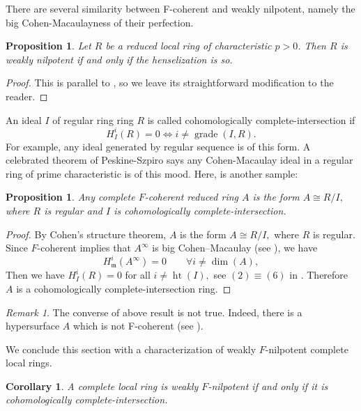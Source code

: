 \documentclass[11pt,a4paper]{amsart}
\numberwithin{equation}{section}
\newtheorem{proposition}[theorem]{Proposition}
\newtheorem{corollary}[theorem]{Corollary}
\theoremstyle{definition}
\theoremstyle{remark}
\newtheorem{remark}[theorem]{Remark}
\newcommand{\grade}{\operatorname{grade}}
\newcommand{\fm}{\mathfrak{m}}
\begin{document}
There are several similarity between F-coherent and weakly nilpotent, namely the big Cohen-Macaulayness of their perfection.
\begin{proposition}
	Let $R$ be a reduced local ring of characteristic $p > 0$. Then $R$ is
	weakly nilpotent if and only if the henselization 
	is so.
\end{proposition}

\begin{proof}
This is parallel to \cite[Proposition 3.18]{Shi10}, so we leave its straightforward modification to the reader.
\end{proof}

An ideal $I$ of regular ring ring $R$ is called  cohomologically complete-intersection if
$$H^i_I(R)=0\Longleftrightarrow i\neq \grade(I,R).$$For example, any ideal generated by regular sequence is of this form. A celebrated theorem of Peskine-Szpiro \cite{PS} says any Cohen-Macaulay ideal in a regular ring of prime characteristic is of this mood. Here, is another sample:
\begin{proposition}\label{4.5} Any complete $F$-coherent reduced ring $A$ is the form
	\(
	A \cong   R/I,
	\)
	where $R$ is regular and $I$ is cohomologically complete-intersection.
\end{proposition}
\begin{proof} By Cohen's structure theorem, $A$ is the form
	\(
	A \cong   R/I,
	\)
	where $R$ is regular. Since $F$-coherent implies that $A^\infty$ is big Cohen--Macaulay (see \cite{Shi10}), we have
	\[
	H_\fm^i(A^\infty)=0 \qquad  \forall i\neq  \dim(A) ,
	\]Then we have
	\(
	H_I^i(R)=0\) for all  \(i\neq \operatorname{ht}(I),
	\) see  $(2)\equiv(6)$ in \cite[Example 4.38]{topo}.
	Therefore $A$ is a cohomologically complete-intersection ring.
\end{proof}


\begin{remark}\label{46}
	The converse of above result is not true. Indeed, there is a hypersurface $A$ which is not F-coherent (see \cite[Example 4.4]{Shi10}).
\end{remark}





We conclude this section with a characterization of weakly \(F\)-nilpotent complete local rings.

\begin{corollary}\label{59}
	A complete local ring is weakly \(F\)-nilpotent if and only if it is cohomologically complete-intersection.
\end{corollary}
\end{document}

